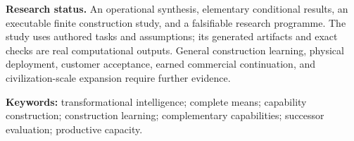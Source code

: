 \documentclass[11pt,letterpaper]{article}
\theoremstyle{remark}\newtheorem{remark}{Remark}[section]
\begin{document}
\begin{statusbox}
\textbf{Research status.} An operational synthesis, elementary conditional results, an executable finite construction study, and a falsifiable research programme. The study uses authored tasks and assumptions; its generated artifacts and exact checks are real computational outputs. General construction learning, physical deployment, customer acceptance, earned commercial continuation, and civilization-scale expansion require further evidence.
\end{statusbox}
{\small\textbf{Keywords:} transformational intelligence; complete means; capability construction; construction learning; complementary capabilities; successor evaluation; productive capacity.}
\clearpage

\clearpage
\tableofcontents
\clearpage








\clearpage
\begingroup\small
\setlength{\bibsep}{5pt}


\endgroup
\end{document}
